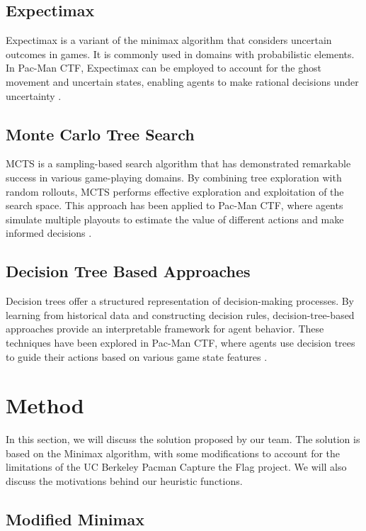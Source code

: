 \documentclass[a4paper,12pt]{article}
\begin{document}
\subsection{Expectimax}
\label{subsec:expectimax}
Expectimax is a variant of the minimax algorithm that considers uncertain outcomes in games. It is commonly used in domains with probabilistic elements. In Pac-Man CTF, Expectimax can be employed to account for the ghost movement and uncertain states, enabling agents to make rational decisions under uncertainty \cite{RIVEST198777}.

\subsection{Monte Carlo Tree Search}
\label{subsec:mcts}
MCTS is a sampling-based search algorithm that has demonstrated remarkable success in various game-playing domains. By combining tree exploration with random rollouts, MCTS performs effective exploration and exploitation of the search space. This approach has been applied to Pac-Man CTF, where agents simulate multiple playouts to estimate the value of different actions and make informed decisions \cite{GELLY20111856}.


\subsection{Decision Tree Based Approaches}
\label{subsec:decision_tree}
Decision trees offer a structured representation of decision-making processes. By learning from historical data and constructing decision rules, decision-tree-based approaches provide an interpretable framework for agent behavior. These techniques have been explored in Pac-Man CTF, where agents use decision trees to guide their actions based on various game state features \cite{Hastie2009}.


\section{Method}
\label{method}

In this section, we will discuss the solution proposed by our team. The solution is based on the Minimax algorithm, with some modifications to account for the limitations of the UC Berkeley Pacman Capture the Flag project. We will also discuss the motivations behind our heuristic functions.

\subsection{Modified Minimax}
\label{subsec:modified_minimax}
\end{document}

